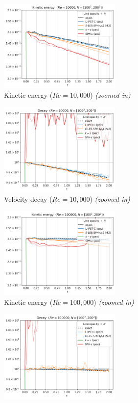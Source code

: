 \begin{figure}[htbp!]
  \begin{subfigure}{7cm}
  \centering\includegraphics[width=6cm]{Code-Figures/long-tgv/limit_ke_re_10000.png}
  \caption{Kinetic energy ($Re = 10,000$) \textit{(zoomed in)}}
  \end{subfigure}
  \begin{subfigure}{7cm}
  \centering\includegraphics[width=6cm]{Code-Figures/long-tgv/limit_decay_re_10000.png}
  \caption{Velocity decay ($Re = 10,000$) \textit{(zoomed in)}}
  \end{subfigure}
  \begin{subfigure}{7cm}
  \centering\includegraphics[width=6cm]{Code-Figures/long-tgv/limit_ke_re_100000.png}
  \caption{Kinetic energy ($Re = 100,000$) \textit{(zoomed in)}}
  \end{subfigure}
  \begin{subfigure}{7cm}
  \centering\includegraphics[width=6cm]{Code-Figures/long-tgv/limit_decay_re_100000.png}

\end{subfigure}
\end{figure}
